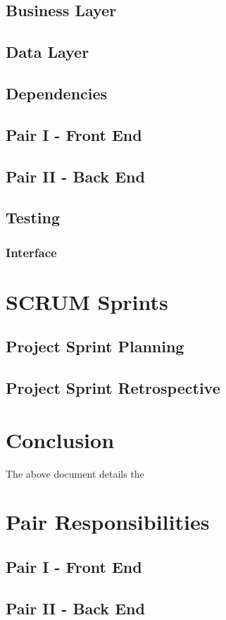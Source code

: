 \documentclass{article}
\begin{document}
\subsection{Business Layer}
\subsection{Data Layer}
\subsection{Dependencies}

\subsection{Pair I - Front End}

\subsection{Pair II - Back End}

\subsection{Testing}
\subsubsection{Interface}

\section{SCRUM Sprints}

\subsection{Project Sprint Planning}

\subsection{Project Sprint Retrospective}

\section{Conclusion}
The above document details the 



\appendix

\section{Pair Responsibilities}

\subsection{Pair I - Front End}

\subsection{Pair II - Back End}
\end{document}

